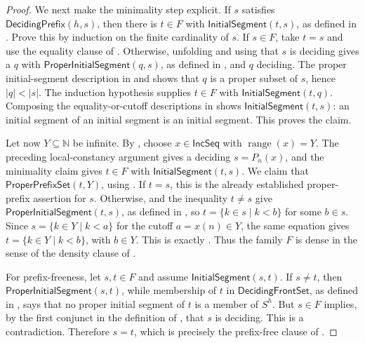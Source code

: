 \begin{proof}
We next make the minimality step explicit.  If $s$ satisfies
$\mathsf{DecidingPrefix}(h,s)$, then there is $t\in F$ with
$\mathsf{InitialSegment}(t,s)$, as defined in .
Prove this by induction on the finite
cardinality of $s$.  If $s\in F$, take $t=s$ and use the equality clause of
.  Otherwise, unfolding
 and using that $s$ is deciding gives a $q$ with
 $\mathsf{ProperInitialSegment}(q,s)$, as defined in
, and $q$ deciding.  The proper
initial-segment description in  and
 shows that $q$ is a proper subset of $s$, hence
$|q|<|s|$.  The induction hypothesis supplies $t\in F$ with
 $\mathsf{InitialSegment}(t,q)$.  Composing the equality-or-cutoff
descriptions in  shows
$\mathsf{InitialSegment}(t,s)$: an initial segment of an initial segment
is an initial segment.  This proves the claim.

Let now $Y\subseteq\mathbb N$ be infinite.  By
, choose $x\in\mathsf{IncSeq}$ with
$\operatorname{range}(x)=Y$.  The preceding local-constancy argument gives
a deciding $s=P_n(x)$, and the minimality claim gives $t\in F$ with
$\mathsf{InitialSegment}(t,s)$.  We claim that
$\mathsf{ProperPrefixSet}(t,Y)$, using .  If $t=s$, this is the already established
proper-prefix assertion for $s$.  Otherwise,  and
the inequality $t\ne s$ give $\mathsf{ProperInitialSegment}(t,s)$, as
defined in , so
$t=\{k\in s\mid k<b\}$ for some $b\in s$.  Since
$s=\{k\in Y\mid k<a\}$ for the cutoff $a=x(n)\in Y$, the same equation
gives $t=\{k\in Y\mid k<b\}$, with $b\in Y$.  This is exactly
.  Thus the family $F$ is dense in the sense of
the density clause of .

For prefix-freeness, let $s,t\in F$ and assume
$\mathsf{InitialSegment}(s,t)$.  If $s\ne t$, then
$\mathsf{ProperInitialSegment}(s,t)$, while membership of $t$ in
$\mathsf{DecidingFrontSet}$, as defined in , says that no proper initial segment of $t$ is a
member of $S^h$.  But $s\in F$ implies, by the first conjunct in the
definition of , that $s$ is deciding.  This is a
contradiction.  Therefore $s=t$, which is precisely the prefix-free clause
of .


\end{proof}
